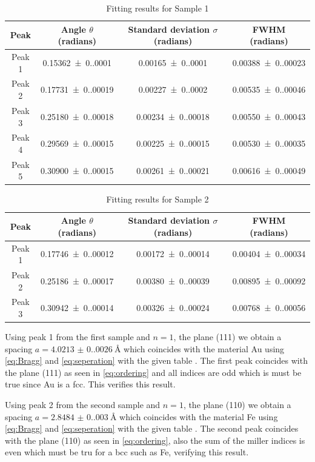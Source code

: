 \begin{table}[H]
    \centering
    \caption{Fitting results for Sample 1}
    \begin{tabular}{cccc}
    \toprule
    Peak & Angle $\theta$ (radians) & Standard deviation $\sigma$ (radians) & FWHM (radians) \\
    \midrule
    Peak 1 & \num{0.15362(0.00010)}{} & \num{0.00165(0.00010)} & \num{0.00388(0.00023)}{} \\
    Peak 2 & \num{0.17731(0.00019)}{} & \num{0.00227(0.00020)}{} & \num{0.00535(0.00046)}{} \\
    Peak 3 & \num{0.25180(0.00018)}{} & \num{0.00234(0.00018)}{} & \num{0.00550(0.00043)}{} \\
    Peak 4 & \num{0.29569(0.00015)}{} & \num{0.00225(0.00015)}{} & \num{0.00530(0.00035)}{} \\
    Peak 5 & \num{0.30900(0.00015)}{} & \num{0.00261(0.00021)}{} & \num{0.00616(0.00049)}{} \\
    \bottomrule
    \end{tabular}
\end{table}

\begin{table}[H]
    \centering
    \caption{Fitting results for Sample 2}
    \begin{tabular}{cccc}
    \toprule
    Peak & Angle $\theta$ (radians) & Standard deviation $\sigma$ (radians) & FWHM (radians) \\
    \midrule
    Peak 1 & \num{0.17746(0.00012)}{} & \num{0.00172(0.00014)}{} & \num{0.00404(0.00034)}{} \\
    Peak 2 & \num{0.25186(0.00017)}{} & \num{0.00380(0.00039)}{} & \num{0.00895(0.00092)}{} \\
    Peak 3 & \num{0.30942(0.00014)}{} & \num{0.00326(0.00024)}{} & \num{0.00768(0.00056)}{} \\
    \bottomrule
    \end{tabular}
\end{table}

Using peak 1 from the first sample and $n=1$, the plane (111) we obtain a spacing $a=\SI{4.0213(0.0026)}{\angstrom}$ which coincides with the material Au using \autoref{eq:Bragg} and \autoref{eq:seperation} with the given table \cite{solidstatephysics2025}. The first peak coincides with the plane (111) as seen in \autoref{eq:ordering} and all indices are odd which is must be true since Au is a fcc. This verifies this result. 

Using peak 2 from the second sample and $n=1$, the plane (110) we obtain a spacing $a=\SI{2.8484(0.0030)}{\angstrom}$ which coincides with the material Fe using \autoref{eq:Bragg} and \autoref{eq:seperation} with the given table \cite{solidstatephysics2025}. The second peak coincides with the plane (110) as seen in \autoref{eq:ordering}, also the sum of the miller indices is even which must be tru for a bcc such as Fe, verifying this result. 


